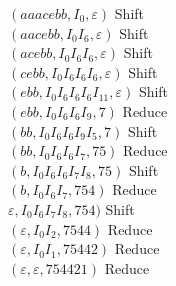 \noindent $(aaacebb, I_0, \varepsilon)$ Shift\\ 
$(aacebb, I_0 I_6, \varepsilon)$ Shift\\
$(acebb, I_0 I_6 I_6, \varepsilon)$ Shift\\
$(cebb, I_0 I_6 I_6 I_6 , \varepsilon)$ Shift\\
$(ebb, I_0 I_6 I_6 I_6 I_{11}, \varepsilon)$ Shift\\
$(ebb, I_0 I_6 I_6 I_9 , 7)$ Reduce\\
$(bb, I_0 I_6 I_6 I_9 I_5, 7)$ Shift\\
$(bb, I_0 I_6 I_6 I_7, 75)$ Reduce\\
$(b, I_0 I_6 I_6 I_7 I_8, 75)$ Shift\\
$(b, I_0 I_6 I_7, 754)$ Reduce\\
$\varepsilon, I_0 I_6 I_7 I_8, 754)$ Shift\\
$(\varepsilon, I_0 I_2, 7544)$ Reduce\\
$(\varepsilon, I_0 I_1, 75442)$ Reduce\\
$(\varepsilon,\varepsilon, 754421)$ Reduce\\

